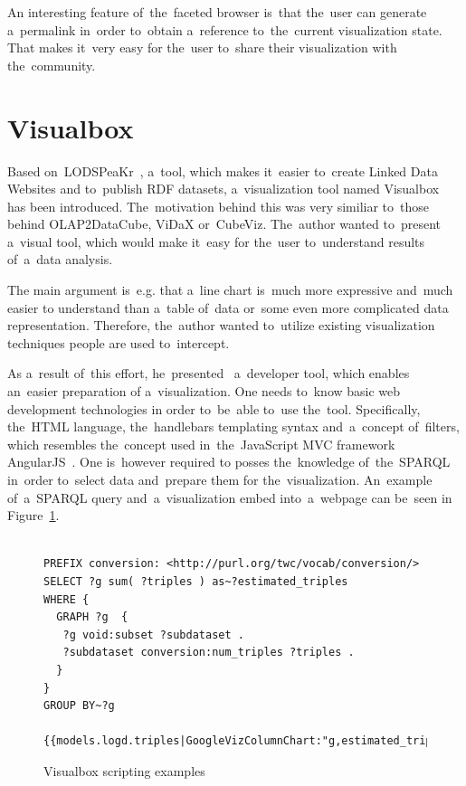 An interesting feature of~the~faceted browser is~that the~user can 
generate a~permalink in~order to~obtain a~reference to~the~current visualization 
state. That makes it~very easy for the~user to~share their visualization with the~community.

\section{Visualbox}
Based on~LODSPeaKr~\cite{lodspeakr}, a~tool, which makes it~easier to~create Linked Data Websites 
and to~publish RDF datasets, a~visualization tool named Visualbox~\cite{visualbox} has been 
introduced. The~motivation behind this was very similiar to~those behind 
OLAP2DataCube, ViDaX or~CubeViz. The~author wanted to~present a~visual tool,
which would 
make it~easy for the~user to~understand results of~a~data analysis.

The main argument is~e.g. that a~line chart is~much more expressive and~much easier
to understand than a~table of~data or~some even more complicated data 
representation. Therefore, the~author wanted to~utilize existing visualization 
techniques people are used to~intercept.

As a~result of~this effort, he~presented~\cite{visualbox-paper} a~developer tool, which enables an~easier preparation
of a~visualization. One needs to~know basic web development technologies 
in order to~be~able to~use the~tool. Specifically, the~HTML language, the~handlebars templating syntax and~a~concept of~filters, which resembles the~concept used in~the~JavaScript MVC framework AngularJS~\cite{angularjs}. One is~however required
to posses the~knowledge of~the~SPARQL in~order to~select data and~prepare them for the~visualization. An~example of~a~SPARQL query and~a~visualization embed into~a~webpage can be~seen
in Figure~\ref{visualbox-example}.

\begin{figure}
\scriptsize\begin{verbatim}

PREFIX conversion: <http://purl.org/twc/vocab/conversion/>
SELECT ?g sum( ?triples ) as~?estimated_triples
WHERE {
  GRAPH ?g  {
   ?g void:subset ?subdataset .
   ?subdataset conversion:num_triples ?triples .
  }
} 
GROUP BY~?g

{{models.logd.triples|GoogleVizColumnChart:"g,estimated_triples,width=1200"}}
\end{verbatim}\normalsize
\caption{Visualbox scripting examples}
\label{visualbox-example}
\end{figure}

